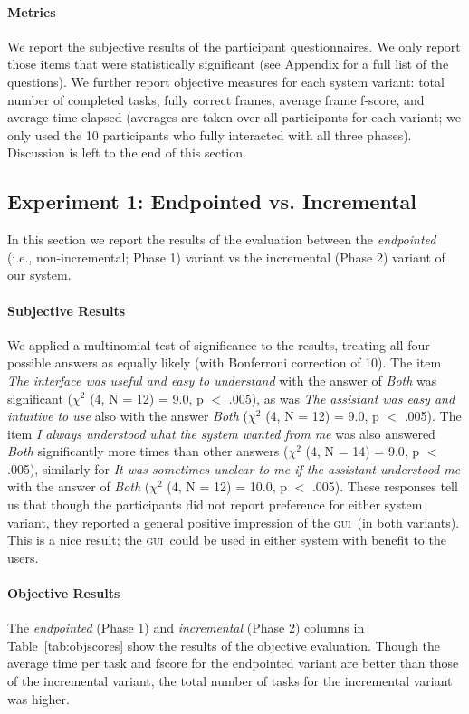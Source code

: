 \documentclass[11pt]{article}
\newcommand{\ui}[0]{\textsc{gui}}
\begin{document}
\paragraph{Metrics} We report the subjective results of the participant questionnaires. We only report those items that were statistically significant (see Appendix for a full list of the questions). We further report objective measures for each system variant: total number of completed tasks, fully correct frames, average frame f-score, and average time elapsed (averages are taken over all participants for each variant; we only used the 10 participants who fully interacted with all three phases). Discussion is left to the end of this section.

\subsection{Experiment 1: Endpointed vs. Incremental}
\label{section:exp1}

In this section we report the results of the evaluation between the \emph{endpointed} (i.e., non-incremental; Phase 1) variant vs the incremental (Phase 2) variant of our system.

\paragraph{Subjective Results} We applied a multinomial test of significance to the results, treating all four possible answers as equally likely (with Bonferroni correction of 10). The item \emph{The interface was useful and easy to understand} with the answer of \emph{Both} was significant ($ \chi^2 $ (4, N = 12) = 9.0, p $<$ .005), as was \emph{The assistant was easy and intuitive to use} also with the answer \emph{Both} ($ \chi^2 $ (4, N = 12) = 9.0, p $<$ .005). The item \emph{I always understood what the system wanted from me} was also answered \emph{Both} significantly more times than other answers ($ \chi^2 $ (4, N = 14) = 9.0, p $<$ .005), similarly for \emph{It was sometimes unclear to me if the assistant understood me} with the answer of \emph{Both} ($ \chi^2 $ (4, N = 12) = 10.0, p $<$ .005).  These responses tell us that though the participants did not report preference for either system variant, they reported a general positive impression of the \ui\ (in both variants). This is a nice result; the \ui\ could be used in either system with benefit to the users.

\paragraph{Objective Results}  The \emph{endpointed} (Phase 1) and \emph{incremental} (Phase 2) columns in Table~\ref{tab:objscores} show the results of the objective evaluation. Though the average time per task and fscore for the endpointed variant are better than those of the incremental variant, the total number of tasks for the incremental variant was higher. 
\end{document}
